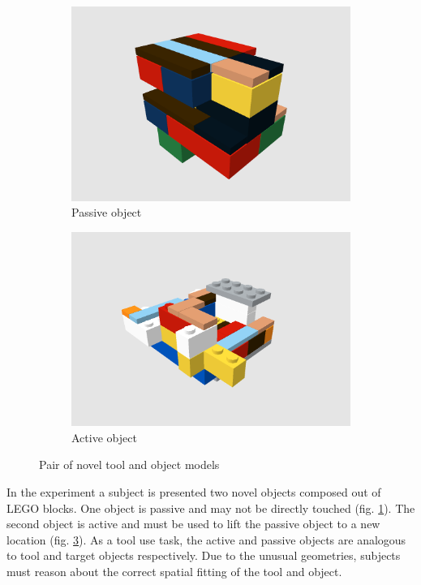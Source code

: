 \documentclass[11]{article}
\begin{document}
\begin{figure}[!h]
  \centering
  \begin{subfigure}{0.49\textwidth}
    \includegraphics[width=1\linewidth]{figures/obj51.png}
    \caption{Passive object}
    \label{fig:obj51}
  \end{subfigure}
  \begin{subfigure}{0.49\textwidth}
    \includegraphics[width=1\linewidth]{figures/obj52.png}
    \caption{Active object}
    \label{fig:obj52}
  \end{subfigure}
  \caption{Pair of novel tool and object models}
\end{figure}

In the experiment a subject is presented two novel objects composed out of LEGO blocks.
One object is passive and may not be directly touched (fig. \ref{fig:obj51}).
The second object is active and must be used to lift the passive object to a new location (fig. \ref{fig:obj52}).
As a tool use task, the active and passive objects are analogous to tool and target objects respectively.
Due to the unusual geometries, subjects must reason about the correct spatial fitting of the tool and object.    
\end{document}
